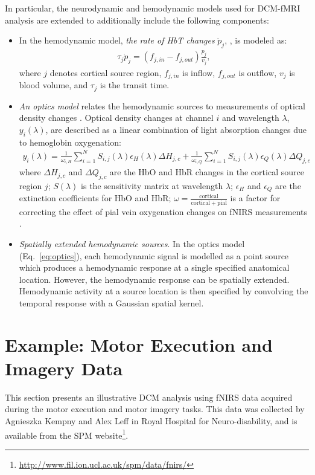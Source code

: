 In particular, the neurodynamic and hemodynamic models used for DCM-fMRI analysis \cite{dcm} are extended to additionally include the following components:
\begin{itemize} 
\item In the hemodynamic model, \emph{the rate of HbT changes} $\dot{p}_j$, \cite{cui10}, is modeled as:
\begin{eqnarray} 
\tau_j \dot{p}_j  =  \left(f_{j,in} - f_{j,out}\right)\frac{p_j}{v_j},
\end{eqnarray}
where $j$ denotes cortical source region, $f_{j,in}$ is inflow, $f_{j,out}$ is outflow, $v_j$ is blood volume, and $\tau_j$ is the transit time. 

\item \emph{An optics model} relates the hemodynamic sources to measurements of optical density changes \cite{delpy1988estimation, arridge1999optical}. Optical density changes at channel $i$ and wavelength $\lambda$, $y_i(\lambda)$, are described as a linear combination of light absorption changes due to hemoglobin oxygenation: 
\begin{eqnarray}\label{eq:optics} 
y_i (\lambda) = \frac{1}{\omega_{i,H}} \sum_{i=1}^{N} S_{i,j}(\lambda)\epsilon_H(\lambda) \Delta H_{j,c} +  \frac{1}{\omega_{i,Q}} \sum_{i=1}^{N} S_{i,j}(\lambda)\epsilon_Q(\lambda) \Delta Q_{j,c}
\end{eqnarray} 
where $\Delta H_{j,c}$ and $\Delta Q_{j,c}$ are the HbO and HbR changes in the cortical source region $j$; $S(\lambda)$ is the sensitivity matrix at wavelength $\lambda$; $\epsilon_H$ and $\epsilon_Q$ are the extinction coefficients for HbO and HbR; $\omega = \frac{\mathrm{cortical}}{\mathrm{cortical} + \mathrm{pial}}$ is a factor for correcting the effect of pial vein oxygenation changes on fNIRS measurements  \cite{gagnon2012quantification}. 

\item \emph{Spatially extended hemodynamic sources}. In the optics model (Eq.~\ref{eq:optics}), each hemodynamic signal is modelled as a point source which produces a hemodynamic response at a single specified anatomical location. However, the hemodynamic response can be spatially extended. Hemodynamic activity at a source location is then specified by convolving the temporal response with a Gaussian spatial kernel.

\end{itemize} 

\section{Example: Motor Execution and Imagery Data} 
This section presents an illustrative DCM analysis using fNIRS data acquired during the motor execution and motor imagery tasks. This data was collected by Agnieszka Kempny and Alex Leff in Royal Hospital for Neuro-disability, and is available from the SPM website\footnote{\url{http://www.fil.ion.ucl.ac.uk/spm/data/fnirs/}}.

